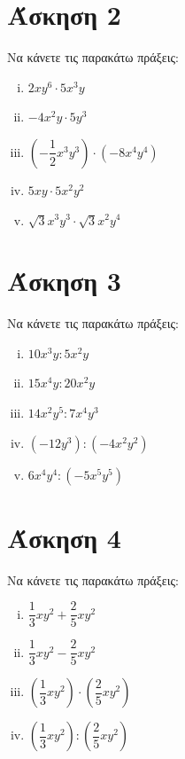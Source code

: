 \documentclass[a4paper,10pt]{report}
\begin{document}
\section*{Άσκηση 2  \hfill \small{ }}
Να κάνετε τις παρακάτω πράξεις:
\begin{enumerate}[i)]
 \item $2xy^{6} \cdot 5x^{3}y$
 \item $-4x^{2}y \cdot 5y^{3}$
 \item $(-\dfrac{1}{2}x^{3}y^{3})\cdot (-8x^{4}y^{4})$
 \item $5xy \cdot 5x^{2}y^{2}$ 
 \item $\sqrt{3}x^{3}y^{3} \cdot \sqrt{3}x^{2}y^{4}$
\end{enumerate}









\section*{Άσκηση 3  \hfill \small{ }}
Να κάνετε τις παρακάτω πράξεις:
\begin{enumerate}[i)]
 \item $10x^{3}y : 5x^{2}y$
 \item $15x^{4}y : 20x^{2}y$
 \item $14x^{2}y^{5} : 7x^{4}y^{3}$
 \item $(-12y^{3}) : (-4x^{2}y^{2})$
 \item $6x^{4}y^{4} : (-5x^{5}y^{5})$
\end{enumerate}



\section*{Άσκηση 4  \hfill \small{ }}
Να κάνετε τις παρακάτω πράξεις:
\begin{enumerate}[i)]
 \item $\dfrac{1}{3}xy^{2}+\dfrac{2}{5}xy^{2}$
 \item $\dfrac{1}{3}xy^{2}-\dfrac{2}{5}xy^{2}$
 \item $(\dfrac{1}{3}xy^{2}) \cdot (\dfrac{2}{5}xy^{2})$
 \item $(\dfrac{1}{3}xy^{2}) : (\dfrac{2}{5}xy^{2})$
\end{enumerate}





 









\end{document}
